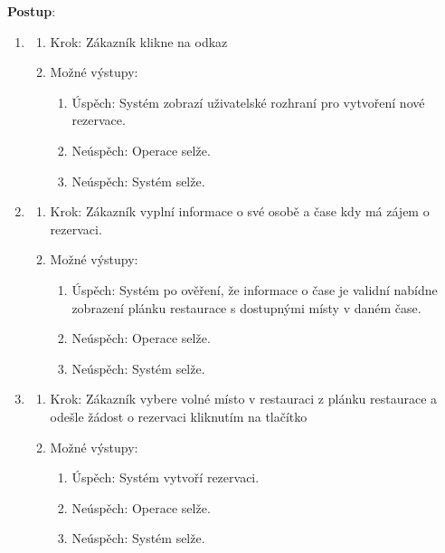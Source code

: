 \documentclass[a4paper,10pt]{article}
\begin{document}
\textbf{Postup}:
\begin{enumerate}
	\item 
	\begin{enumerate}
		\item Krok: Zákazník klikne na odkaz  
		\item Možné výstupy:
		\begin{enumerate}
			\item Úspěch: Systém zobrazí uživatelské rozhraní pro vytvoření nové rezervace.
			\item Neúspěch: Operace selže. 
			\item Neúspěch: Systém selže. 
		\end{enumerate} 
	\end{enumerate}

	\item 
	\begin{enumerate}
		\item Krok: Zákazník vyplní informace o své osobě a čase kdy má zájem o rezervaci. 
		\item Možné výstupy:
		\begin{enumerate}
			\item Úspěch: Systém po ověření, že informace o čase je validní nabídne zobrazení plánku restaurace s dostupnými místy v daném čase.
			\item Neúspěch: Operace selže.
			\item Neúspěch: Systém selže.
		\end{enumerate} 
	\end{enumerate}

	\item 
	\begin{enumerate}
		\item Krok: Zákazník vybere volné místo v restauraci z plánku restaurace a odešle žádost o rezervaci kliknutím na tlačítko 
		\item Možné výstupy:
		\begin{enumerate}
			\item Úspěch: Systém vytvoří rezervaci.
			\item Neúspěch: Operace selže.
			\item Neúspěch: Systém selže.
		\end{enumerate} 
	\end{enumerate}


\end{enumerate}
\end{document}
